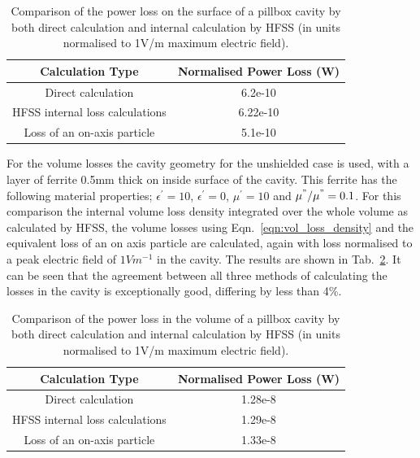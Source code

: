\begin{table}
\caption{Comparison of the power loss on the surface of a pillbox cavity by both direct calculation and internal calculation by HFSS (in units normalised to 1V/m maximum electric field).}
\begin{center}
\begin{tabular}{c | c }
Calculation Type & Normalised Power Loss (W)\\ \hline
Direct calculation & 6.2e-10\\ \hline
HFSS internal loss calculations & 6.22e-10 \\ \hline
Loss of an on-axis particle	 & 5.1e-10 \\
\end{tabular}
\end{center}
\label{tab:surface_losses_ferr}
\end{table}

For the volume losses the cavity geometry for the unshielded case is used, with a layer of ferrite 0.5mm thick on inside surface of the cavity. This ferrite has the following material properties; $\epsilon^{'} = 10$, $\epsilon^{'}=0$, $\mu^{'}=10$ and $\mu^{"} / \mu^{"} = 0.1$. For this comparison the internal volume loss density integrated over the whole volume as calculated by HFSS, the volume losses using Eqn.~\ref{eqn:vol_loss_density} and the equivalent loss of an on axis particle are calculated, again with loss normalised to a peak electric field of $1 V m^{-1}$ in the cavity. The results are shown in Tab.~\ref{tab:volume_losses_ferr}. It can be seen that the agreement between all three methods of calculating the losses in the cavity is exceptionally good, differing by less than 4\%.

\begin{table}
\caption{Comparison of the power loss in the volume of a pillbox cavity by both direct calculation and internal calculation by HFSS (in units normalised to 1V/m maximum electric field).}
\begin{center}
\begin{tabular}{c | c }
Calculation Type & Normalised Power Loss (W)\\ \hline
Direct calculation & 1.28e-8\\ \hline
HFSS internal loss calculations & 1.29e-8 \\ \hline
Loss of an on-axis particle & 1.33e-8 \\
\end{tabular}
\end{center}
\label{tab:volume_losses_ferr}
\end{table}


